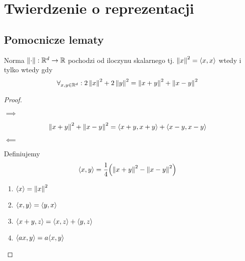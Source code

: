 \section{Twierdzenie o reprezentacji}
\subsection{Pomocnicze lematy}
\begin{lemma}
    Norma \( \left\Vert \cdot \right\Vert : \mathbb{R}^d \rightarrow \mathbb{R} \) pochodzi od iloczynu skalarnego tj. \( \left\Vert x \right\Vert^2 = \left\langle x, x\right\rangle \) wtedy i tylko wtedy gdy 
    \[
        \forall_{x, y \in \mathbb{R}^d} : 2\left\Vert x \right\Vert^2  + 2\left\Vert y \right\Vert^2 = \left\Vert x + y \right\Vert^2 + \left\Vert x - y \right\Vert^2
    \]
\end{lemma}

\begin{proof} \( \)
    \begin{description}
        \item \( \implies \)
        
        \[
            \left\Vert x + y \right\Vert^2 + \left\Vert x - y \right\Vert^2 
                = \left\langle x + y, x + y\right\rangle
                    + \left\langle x - y, x - y\right\rangle
        \]
        
        \item \( \impliedby \)
        
        Definiujemy \[ 
            \dotproduct{x, y} = \frac{1}{4} \pars{\norm{x + y}^2 - \norm{x - y}^2}
        \]
        
        \begin{enumerate}
            \item \( \left\langle x\right\rangle = \left\Vert x \right\Vert^2 \)
            \item \( \left\langle x, y\right\rangle = \left\langle y, x\right\rangle \)
            \item \( \left\langle x + y, z\right\rangle = \left\langle x, z\right\rangle + \left\langle y, z\right\rangle \)
            \item \( \dotproduct{ax, y} = a\dotproduct{x, y} \)
        \end{enumerate}
        
    \end{description}
\end{proof}

